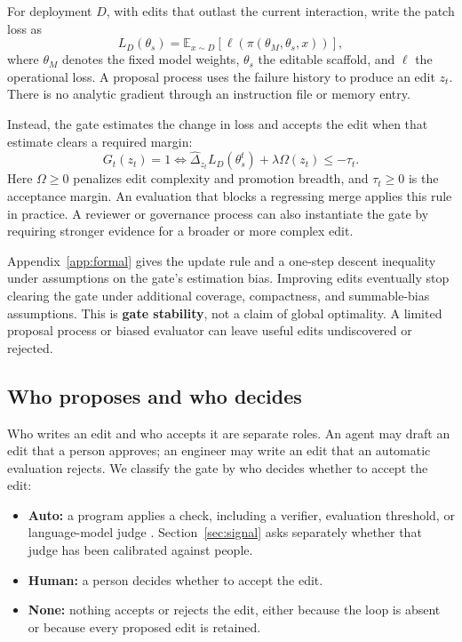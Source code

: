 For deployment \(D\), with edits that outlast the current interaction, write the patch loss as \[L_D(\theta_s)=\mathbb{E}_{x\sim D}\!\left[\ell(\pi(\theta_M,\theta_s,x))\right],\] where \(\theta_M\) denotes the fixed model weights, \(\theta_s\) the editable scaffold, and \(\ell\) the operational loss. A proposal process uses the failure history to produce an edit \(z_t\). There is no analytic gradient through an instruction file or memory entry.

Instead, the gate estimates the change in loss and accepts the edit when that estimate clears a required margin: \[G_t(z_t)=1\iff\widehat{\Delta}_{z_t}L_D(\theta_s^t)+\lambda\Omega(z_t)\leq-\tau_t.\] Here \(\Omega\geq0\) penalizes edit complexity and promotion breadth, and \(\tau_t\geq0\) is the acceptance margin. An evaluation that blocks a regressing merge applies this rule in practice. A reviewer or governance process can also instantiate the gate by requiring stronger evidence for a broader or more complex edit.

Appendix~\ref{app:formal} gives the update rule and a one-step descent inequality under assumptions on the gate's estimation bias. Improving edits eventually stop clearing the gate under additional coverage, compactness, and summable-bias assumptions. This is \textbf{gate stability}, not a claim of global optimality. A limited proposal process or biased evaluator can leave useful edits undiscovered or rejected.

\subsection{Who proposes and who decides}\label{who-proposes-and-who-decides}

Who writes an edit and who accepts it are separate roles. An agent may draft an edit that a person approves; an engineer may write an edit that an automatic evaluation rejects. We classify the gate by who decides whether to accept the edit:

\begin{itemize}
\tightlist
\item
  \textbf{Auto:} a program applies a check, including a verifier, evaluation threshold, or language-model judge \cite{zheng2023judge}. Section~\ref{sec:signal} asks separately whether that judge has been calibrated against people.
\item
  \textbf{Human:} a person decides whether to accept the edit.
\item
  \textbf{None:} nothing accepts or rejects the edit, either because the loop is absent or because every proposed edit is retained.
\end{itemize}

